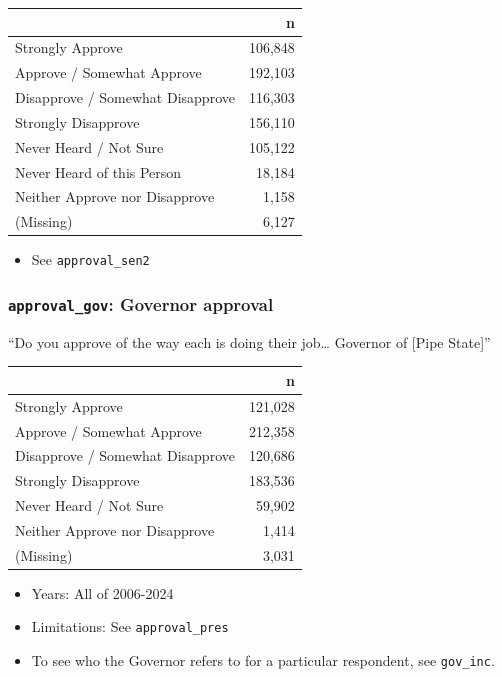 \documentclass[10pt,article,oneside]{memoir}
\begin{document}
\begin{table}[H]
\centering
\begin{tabular}[t]{lr}
\toprule
 & n\\
\midrule
Strongly Approve & 106,848\\
Approve / Somewhat Approve & 192,103\\
Disapprove / Somewhat Disapprove & 116,303\\
Strongly Disapprove & 156,110\\
Never Heard / Not Sure & 105,122\\
Never Heard of this Person & 18,184\\
Neither Approve nor Disapprove & 1,158\\
(Missing) & 6,127\\
\bottomrule
\end{tabular}
\end{table}

\begin{itemize}
\tightlist
\item
  See \texttt{approval\_sen2}
\end{itemize}

\subsubsection{\texorpdfstring{\texttt{approval\_gov}: Governor
approval}{approval\_gov: Governor approval}}\label{approval_gov-governor-approval}

``Do you approve of the way each is doing their job\ldots{} Governor of
{[}Pipe State{]}''

\begin{table}[H]
\centering
\begin{tabular}[t]{lr}
\toprule
 & n\\
\midrule
Strongly Approve & 121,028\\
Approve / Somewhat Approve & 212,358\\
Disapprove / Somewhat Disapprove & 120,686\\
Strongly Disapprove & 183,536\\
Never Heard / Not Sure & 59,902\\
Neither Approve nor Disapprove & 1,414\\
(Missing) & 3,031\\
\bottomrule
\end{tabular}
\end{table}

\begin{itemize}
\tightlist
\item
  Years: All of 2006-2024
\item
  Limitations: See \texttt{approval\_pres}
\item
  To see who the Governor refers to for a particular respondent, see
  \texttt{gov\_inc}.
\end{itemize}
\end{document}

